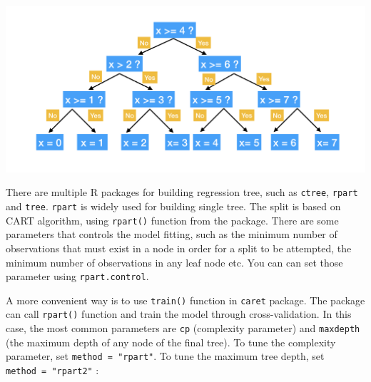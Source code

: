 \documentclass[12pt,]{krantz}
\begin{document}
\includegraphics{images/BinaryTree.png}

There are multiple R packages for building regression tree, such as \texttt{ctree}, \texttt{rpart} and \texttt{tree}. \texttt{rpart} is widely used for building single tree. The split is based on CART algorithm, using \texttt{rpart()} function from the package. There are some parameters that controls the model fitting, such as the minimum number of observations that must exist in a node in order for a split to be attempted, the minimum number of observations in any leaf node etc. You can can set those parameter using \texttt{rpart.control}.

A more convenient way is to use \texttt{train()} function in \texttt{caret} package. The package can call \texttt{rpart()} function and train the model through cross-validation. In this case, the most common parameters are \texttt{cp} (complexity parameter) and \texttt{maxdepth} (the maximum depth of any node of the final tree). To tune the complexity parameter, set \texttt{method\ =\ "rpart"}. To tune the maximum tree depth, set \texttt{method\ =\ "rpart2"} :
\end{document}
